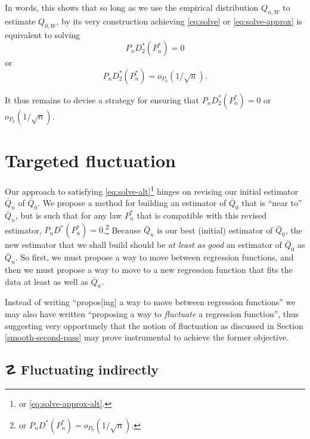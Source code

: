 \documentclass[
  11pt,
  openright,twoside]{book}
\DeclareRobustCommand{\stixdanger}{%
  {\usefont{U}{stixbbit}{m}{it}\symbol{"F6}}%
}
\newcommand{\Qbar}{\bar{Q}}
\theoremstyle{definition}
\theoremstyle{definition}
\theoremstyle{definition}
\theoremstyle{definition}
\theoremstyle{remark}
\begin{document}
In words, this shows that so long as we use the empirical distribution
\(Q_{n,W}\) to estimate \(Q_{0,W}\), by its very construction achieving
\eqref{eq:solve} or \eqref{eq:solve-approx} is equivalent to solving
\begin{equation} 
P_n  D_{2}^*(P_{n}^*)  = 0 \label{eq:solve-alt}
\end{equation}
or
\begin{equation} 
P_n D_{2}^*(P_{n}^*) = o_{P_0}(1/\sqrt{n}). \label{eq:solve-approx-alt} 
\end{equation}

It thus remains to devise a strategy for ensuring that \(P_n D_2^*(P_n^*) = 0\) or \(o_{P_0}(1/\sqrt{n})\).

\hypertarget{targeted-fluctuation-TMLE}{%
\section{Targeted fluctuation}\label{targeted-fluctuation-TMLE}}

Our approach to satisfying \eqref{eq:solve-alt}\footnote{or \eqref{eq:solve-approx-alt}.}
hinges on revising our initial estimator \(\Qbar_n\) of \(\Qbar_0\). We propose a
method for building an estimator of \(\Qbar_0\) that is ``near to'' \(\Qbar_n\), but
is such that for any law \(P_n^*\) that is compatible with this revised
estimator, \(P_n D^*(P_n^*) = 0\).\footnote{or \(P_n D^*(P_n^*) = o_{P_0}(1/\sqrt{n})\).}
Because \(\Qbar_n\) is our best (initial) estimator of \(\Qbar_0\), the new
estimator that we shall build should be \emph{at least as good} an estimator of
\(\Qbar_0\) as \(\Qbar_n\). So first, we must propose a way to move between
regression functions, and then we must propose a way to move to a new
regression function that fits the data at least as well as \(\Qbar_n\).

Instead of writing ``propos{[}ing{]} a way to move between regression functions'' we
may also have written ``proposing a way to \emph{fluctuate} a regression function'',
thus suggesting very opportunely that the notion of fluctuation as discussed
in Section \ref{smooth-second-pass} may prove instrumental to achieve the
former objective.

\hypertarget{fluctuating-indirectly}{%
\subsection{\texorpdfstring{☡ \stixdanger{} Fluctuating indirectly}{☡  Fluctuating indirectly}}\label{fluctuating-indirectly}}
\end{document}
